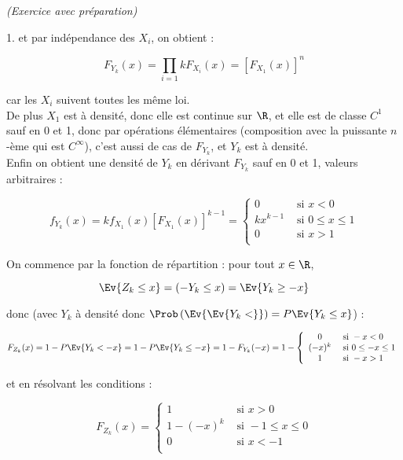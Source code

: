\documentclass[11pt]{article}%
\begin{document}
\begin{exercice}{\it (Exercice avec préparation)}
\begin{noliste}{1.}
 et par indépendance des $X_{i}$, on obtient : 
 
\[
 F_{ Y_{k} } (x) = \prod\limits_{i = 1}{k} F_{ X_{i} } (x) = [ F_{
X_{1} } (x) ]^{n} 
\]

 car les $X_{i}$ suivent toutes les même loi. \\

 De plus $X_{1}$ est à densité, donc elle est continue sur $\R$, et
elle est de classe $C^{1}$ sauf en 0 et 1, donc par opérations
élémentaires (composition avec la puissante $n$-ème qui est
$C^{\infty}$), c'est aussi de cas de $F_{ Y_{k} }$, et $Y_{k}$ est à
densité. \\

 Enfin on obtient une densité de $Y_{k}$ en dérivant $F_{ Y_{k} }$ sauf
en 0 et 1, valeurs arbitraires : 
 
\[
 f_{ Y_{k} } (x) = k f_{ X_{1} } (x) [ F_{ X_{1} } (x) ]^{k-1} =
\left\{ 
\begin{array}{cl}
 0 & \text{ si } x < 0 \\
k x^{k-1} & \text{ si } 0 \leq x \leq 1 \\
0 & \text{ si } x > 1 \\
\end{array}
\right. 
\]

 \item On commence par la fonction de répartition : pour tout $x \in
\R$, 
 
\[
 \Ev{Z_{k} \leq x } = ( - Y_{k} \leq x ) = \Ev{ Y_{k} \geq - x } 
\]

 donc (avec $Y_{k}$ à densité donc $\Prob\left(\Ev{\Ev{ Y_{k} <
}}\right) = P \Ev{ Y_{k} \leq x }$) :
 
\[
 F_{ Z_{k} } (x ) = 1 - P \Ev{ Y_{k} < - x} = 1 - P \Ev{ Y_{k} \leq - x
} = 1 - F_{ Y_{k} } (-x) = 1 - \left\{ 
\begin{array}{cl}
 0 & \text{ si } -x < 0 \\
(-x)^{k} & \text{ si } 0 \leq -x \leq 1 \\
1 & \text{ si } -x > 1 \\
\end{array}
\right. 
\]

 et en résolvant les conditions : 
 
\[
 F_{ Z_{k} } (x) = \left\{ 
\begin{array}{cl}
 1 & \text{ si } x > 0 \\
1 - (-x)^{k} & \text{ si } -1 \leq x \leq 0 \\
0 & \text{ si } x < - 1 \\
\end{array}
\right. 
\]


\end{noliste}
\end{exercice}
\end{document}
